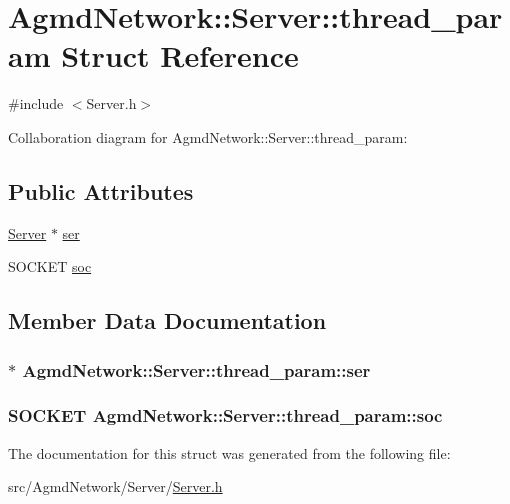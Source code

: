 \hypertarget{struct_agmd_network_1_1_server_1_1thread__param}{\section{Agmd\+Network\+:\+:Server\+:\+:thread\+\_\+param Struct Reference}
\label{struct_agmd_network_1_1_server_1_1thread__param}
}


{\ttfamily \#include $<$Server.\+h$>$}



Collaboration diagram for Agmd\+Network\+:\+:Server\+:\+:thread\+\_\+param\+:
\subsection*{Public Attributes}
\begin{DoxyCompactItemize}
\item 
\hyperlink{class_agmd_network_1_1_server}{Server} $\ast$ \hyperlink{struct_agmd_network_1_1_server_1_1thread__param_a18b557f0dd1b206db390c4468d9d2637}{ser}
\item 
S\+O\+C\+K\+E\+T \hyperlink{struct_agmd_network_1_1_server_1_1thread__param_a0069978413f8477913f695b8418b9251}{soc}
\end{DoxyCompactItemize}


\subsection{Member Data Documentation}
\hypertarget{struct_agmd_network_1_1_server_1_1thread__param_a18b557f0dd1b206db390c4468d9d2637}{
\subsubsection[{ser}]{$\ast$ Agmd\+Network\+::\+Server\+::thread\+\_\+param\+::ser}}\label{struct_agmd_network_1_1_server_1_1thread__param_a18b557f0dd1b206db390c4468d9d2637}
\hypertarget{struct_agmd_network_1_1_server_1_1thread__param_a0069978413f8477913f695b8418b9251}{
\subsubsection[{soc}]{\setlength{\rightskip}{0pt plus 5cm}S\+O\+C\+K\+E\+T Agmd\+Network\+::\+Server\+::thread\+\_\+param\+::soc}}\label{struct_agmd_network_1_1_server_1_1thread__param_a0069978413f8477913f695b8418b9251}


The documentation for this struct was generated from the following file\+:\begin{DoxyCompactItemize}
\item 
src/\+Agmd\+Network/\+Server/\hyperlink{_server_8h}{Server.\+h}\end{DoxyCompactItemize}
